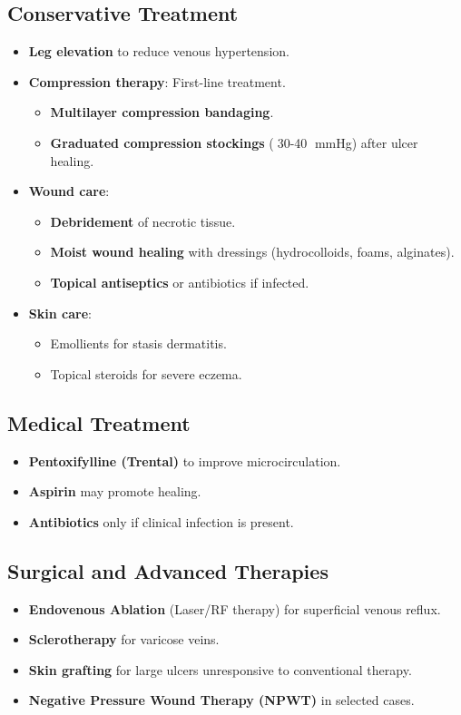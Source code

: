 \documentclass{article}
\begin{document}
\subsection{Conservative Treatment}
\begin{itemize}
    \item \textbf{Leg elevation} to reduce venous hypertension.
    \item \textbf{Compression therapy}: First-line treatment.
    \begin{itemize}
        \item \textbf{Multilayer compression bandaging}.
        \item \textbf{Graduated compression stockings} (30-40 mmHg) after ulcer healing.
    \end{itemize}
    \item \textbf{Wound care}:
    \begin{itemize}
        \item \textbf{Debridement} of necrotic tissue.
        \item \textbf{Moist wound healing} with dressings (hydrocolloids, foams, alginates).
        \item \textbf{Topical antiseptics} or antibiotics if infected.
    \end{itemize}
    \item \textbf{Skin care}:
    \begin{itemize}
        \item Emollients for stasis dermatitis.
        \item Topical steroids for severe eczema.
    \end{itemize}
\end{itemize}

\subsection{Medical Treatment}
\begin{itemize}
    \item \textbf{Pentoxifylline (Trental\textregistered)} to improve microcirculation.
    \item \textbf{Aspirin} may promote healing.
    \item \textbf{Antibiotics} only if clinical infection is present.
\end{itemize}

\subsection{Surgical and Advanced Therapies}
\begin{itemize}
    \item \textbf{Endovenous Ablation} (Laser/RF therapy) for superficial venous reflux.
    \item \textbf{Sclerotherapy} for varicose veins.
    \item \textbf{Skin grafting} for large ulcers unresponsive to conventional therapy.
    \item \textbf{Negative Pressure Wound Therapy (NPWT)} in selected cases.
\end{itemize}
\end{document}
